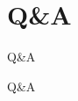 \section{Q\&A}
\begin{frame}{Q\&A}
    \begin{center}
        {\huge Q\&A} 
    \end{center}
\end{frame}